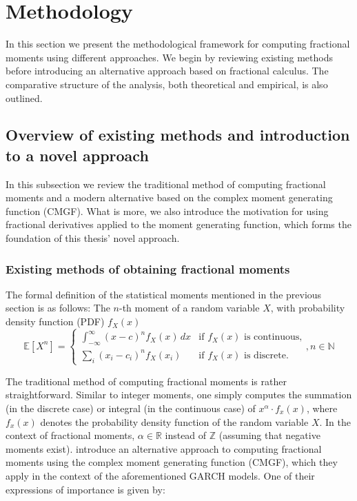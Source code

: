 \section{Methodology}\label{s:methodology}
In this section we present the methodological framework for computing fractional moments using different approaches. We begin by reviewing existing methods before introducing an alternative approach based on fractional calculus. The comparative structure of the analysis, both theoretical and empirical, is also outlined. 

\subsection{Overview of existing methods and introduction to a novel approach}

In this subsection we review the traditional method of computing fractional moments and a modern alternative based on the complex moment generating function (CMGF). What is more, we also introduce the motivation for using fractional derivatives applied to the moment generating function, which forms the foundation of this thesis’ novel approach.

\subsubsection{Existing methods of obtaining fractional moments}\label{ss:methodology_introduction}
The formal definition of the statistical moments mentioned in the previous section is as follows: The \(n\)-th moment of a random variable \(X\), with probability density function (PDF) \(f_X(x)\) 
\[
\mathbb{E}[X^n] = 
\begin{cases} 
\int_{-\infty}^{\infty} (x - c)^n f_X(x) \, dx & \text{if } f_X(x) \text{ is continuous,} \\ 
\sum_{i} (x_i - c_ i)^n f_X(x_i) & \text{if } f_X(x) \text{ is discrete.} 
\end{cases}, n \in \mathbb{N}
\] \cite{feller1957}

The traditional method of computing fractional moments is rather straightforward. Similar to integer moments, one simply computes the summation (in the discrete case) or integral (in the continuous case) of \(x^\alpha \cdot f_x(x)\), where \(f_x(x)\) denotes the probability density function of the random variable \(X\). In the context of fractional moments, \(\alpha \in \mathbb{R}\) instead of \(\mathbb{Z}\) (assuming that negative moments exist). \cite{hansen2024} introduce an alternative approach to computing fractional moments using the complex moment generating function (CMGF), which they apply in the context of the aforementioned GARCH models. One of their expressions of importance is given by:

